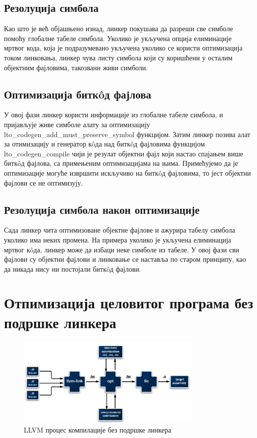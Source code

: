 \documentclass[12pt,oneside]{memoir}
\begin{document}
\subsection{Резолуција симбола}
Као што је већ објашњено изнад, линкер покушава да разреши све симболе помоћу
глобалне табеле симбола.
Уколико је укључена опција елиминације мртвог кода, која је подразумевано укључена
уколико се користи оптимизација током линковања, линкер чува листу симбола који
су коришћени у осталим објектним фајловима, такозвани живи симболи.

\subsection{Оптимизација битк\^{o}д фајлова} 
У овој фази линкер користи информације из глобалне табеле симбола, и пријављује
живе симболе алату за оптимизацију
lto{\_}codegen{\_}add{\_}must{\_}preserve{\_}symbol функцијом.
Затим линкер позива алат за отимизацију и генератор к\^{o}да над битк\^{o}д фајловима
функцијом lto{\_}codegen{\_}compile чији је резулат објектни фајл
који настао спајањем више битк\^{o}д фајлова, са примењеним оптимизацијама на њима.
Примећујемо да је оптимизације могуће извршити искључиво на битк\^{o}д фајловима,
то јест објектни фајлови се не оптимизују.

\subsection{Резолуција симбола након оптимизације}
Сада линкер чита оптимизоване објектне фајлове и ажурира табелу симбола уколико 
има неких промена. На примера уколико је укључена елиминација мртвог к\^{o}да,
линкер може да избаци неке симболе из табеле.
У овој фази сви фајлови су објектни фајлови и линковање се наставља
по старом принципу, као да никада нису ни постојали битк\^{o}д фајлови.

\section{Отпимизација целовитог програма без подршке линкера}
\begin{figure}[!ht]
  \centering
  \includegraphics[width=0.8\textwidth]{llvm_link.png}
  \caption{LLVM процес компилације без подршке линкера}
  \label{fig:grafikon}
\end{figure}
\end{document}
